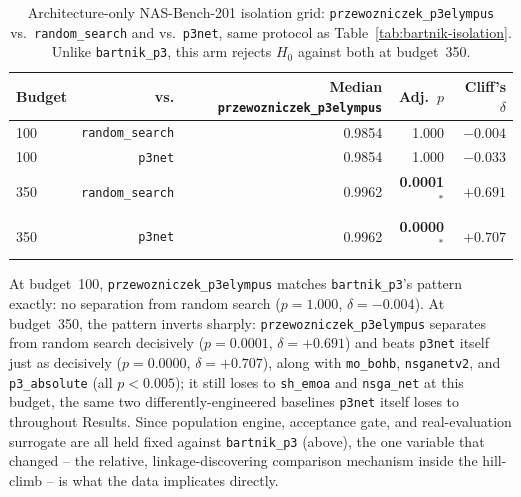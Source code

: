 \begin{table}[t]
    \centering
    \footnotesize
    \caption{Architecture-only NAS-Bench-201 isolation grid: \texttt{przewozniczek\_p3elympus} vs.\ \texttt{random\_search} and vs.\ \texttt{p3net}, same protocol as Table~\ref{tab:bartnik-isolation}. Unlike \texttt{bartnik\_p3}, this arm rejects $H_0$ against both at budget~350.}
    \label{tab:przewozniczek-isolation}
    \begin{tabular}{@{}lrrrr@{}}
        \toprule
        \textbf{Budget} & \textbf{vs.} & \textbf{Median \texttt{przewozniczek\_p3elympus}} & \textbf{Adj.\ $p$} & \textbf{Cliff's $\delta$} \\
        \midrule
        100 & \texttt{random\_search} & 0.9854 & 1.000 & $-0.004$ \\
        100 & \texttt{p3net}          & 0.9854 & 1.000 & $-0.033$ \\
        350 & \texttt{random\_search} & 0.9962 & \textbf{0.0001$^{*}$} & $+0.691$ \\
        350 & \texttt{p3net}          & 0.9962 & \textbf{0.0000$^{*}$} & $+0.707$ \\
        \bottomrule
    \end{tabular}
\end{table}

At budget~100, \texttt{przewozniczek\_p3elympus} matches \texttt{bartnik\_p3}'s pattern exactly: no separation from random search ($p=1.000$, $\delta=-0.004$). At budget~350, the pattern inverts sharply: \texttt{przewozniczek\_p3elympus} separates from random search decisively ($p=0.0001$, $\delta=+0.691$) and beats \texttt{p3net} itself just as decisively ($p=0.0000$, $\delta=+0.707$), along with \texttt{mo\_bohb}, \texttt{nsganetv2}, and \texttt{p3\_absolute} (all $p<0.005$); it still loses to \texttt{sh\_emoa} and \texttt{nsga\_net} at this budget, the same two differently-engineered baselines \texttt{p3net} itself loses to throughout Results. Since population engine, acceptance gate, and real-evaluation surrogate are all held fixed against \texttt{bartnik\_p3} (above), the one variable that changed -- the relative, linkage-discovering comparison mechanism inside the hill-climb -- is what the data implicates directly.

